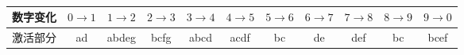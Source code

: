 \begin{figure}[!h]
\begin{center}
\end{center}
\caption{}
\label{i110:112}
\end{figure}

\begin{table}[h]
\centering
\begin{tabular}{c||c|c|c|c|c|c|c|c|c|c}
数字变化&$0\rightarrow 1$&$1\rightarrow 2$&$2\rightarrow 3$&$3\rightarrow 4$&$4\rightarrow 5$&$5\rightarrow 6$&$6\rightarrow 7$&$7\rightarrow 8$&$8\rightarrow 9$&$9\rightarrow 0$\\
\hline
激活部分&ad&abdeg&bcfg&abcd&acdf&bc&de&def&bc&bcef
\end{tabular}
\caption{}
\label{jishuqi}
\end{table}

\begin{figure}[!h]
\begin{center}
\\
\end{center}
\caption{}
\label{i113:114}
\end{figure}

